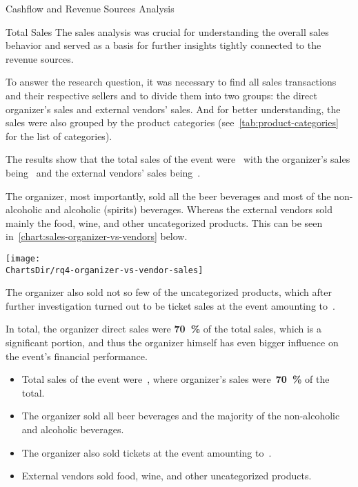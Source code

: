 \begin{section}{Cashflow and Revenue Sources Analysis}
\begin{subsection}{Total Sales}
		The sales analysis was crucial for understanding the overall sales behavior and served as a basis for further insights tightly connected to the revenue sources.

		To answer the research question, it was necessary to find all sales transactions and their respective sellers and to divide them into two groups: the direct organizer's sales and external vendors' sales.
		And for better understanding, the sales were also grouped by the product categories (see~\autoref{tab:product-categories} for the list of categories).

		The results show that the total sales of the event were~ with the organizer's sales being~ and the external vendors' sales being~.

		The organizer, most importantly, sold all the beer beverages and most of the non-alcoholic and alcoholic (spirits) beverages.
		Whereas the external vendors sold mainly the food, wine, and other uncategorized products.
		This can be seen in~\autoref{chart:sales-organizer-vs-vendors} below.

		\begin{chart}[h]
			\centering
			\texttt{[image: \\ChartsDir/rq4-organizer-vs-vendor-sales]}
			\caption{ Sales of the Organizer vs. External Vendors}
			\label{chart:sales-organizer-vs-vendors}
			\source
		\end{chart}

		\pagebreak[4]

		The organizer also sold not so few of the uncategorized products, which after further investigation turned out to be ticket sales at the event amounting to~.

		In total, the organizer direct sales were \textbf{70~\%} of the total sales, which is a significant portion, and thus the organizer himself has even bigger influence on the event's financial performance.

		\begin{keytakeaways}
			\begin{itemize}
				\item Total sales of the event were~, where organizer's sales were~\textbf{70~\%} of the total.
				\item The organizer sold all beer beverages and the majority of the non-alcoholic and alcoholic beverages.
				\item The organizer also sold tickets at the event amounting to~.
				\item External vendors sold food, wine, and other uncategorized products.
			\end{itemize}
		\end{keytakeaways}
	\end{subsection}



\end{section}
